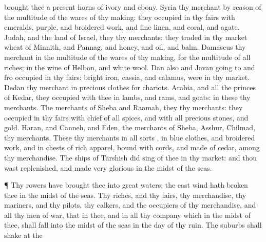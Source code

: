 {brought thee
{} a
present
horns of
ivory and
ebony.
Syria
{} thy
merchant by reason of the
multitude of the wares of thy
making: they
occupied in thy
fairs with
emeralds,
purple, and broidered
work, and fine
linen, and
coral, and
agate.
Judah, and the
land of
Israel, they
{} thy
merchants: they
traded in thy
market
wheat of
Minnith, and
Pannag, and
honey, and
oil, and
balm.
Damascus
{} thy
merchant in the
multitude of the wares of thy
making, for the
multitude of all
riches; in the
wine of
Helbon, and
white
wool.
Dan also and
Javan going to and
fro
occupied in thy
fairs:
bright
iron,
cassia, and
calamus, were in thy
market.
Dedan
{} thy
merchant in
precious
clothes for
chariots.
Arabia, and all the
princes of
Kedar, they
occupied with
thee in
lambs, and
rams, and
goats: in these
{} thy
merchants.
The
merchants of
Sheba and
Raamah, they
{} thy
merchants: they
occupied in thy
fairs with
chief of all
spices, and with all
precious
stones, and
gold.
Haran, and
Canneh, and
Eden, the
merchants of
Sheba,
Asshur,
{}
Chilmad,
{} thy
merchants.
These
{} thy
merchants in all
sorts
{}, in
blue
clothes, and broidered
work, and in
chests of rich
apparel,
bound with
cords, and made of
cedar, among thy
merchandise.
The
ships of
Tarshish did
sing of thee in thy
market: and thou wast
replenished, and made
very
glorious in the
midst of the
seas.
\par }{\PP {}¶ Thy
rowers have
brought thee into
great
waters: the
east
wind hath
broken thee in the
midst of the
seas.
Thy
riches, and thy
fairs, thy
merchandise, thy
mariners, and thy
pilots, thy
calkers, and the
occupiers of thy
merchandise, and all thy
men of
war, that
{} in thee, and in all thy
company which
{} in the
midst of thee, shall
fall into the
midst of the
seas in the
day of thy
ruin.
The
suburbs shall
shake at the
}
